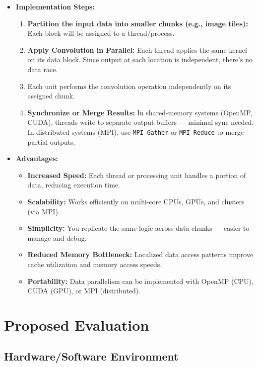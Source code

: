 \documentclass[conference, 10pt]{IEEEtran}
\begin{document}
\begin{itemize}
    \item \textbf{Implementation Steps:}
    \begin{enumerate}
        \item \textbf{Partition the input data into smaller chunks (e.g., image tiles):} Each block will be assigned to a thread/process.
        \item \textbf{Apply Convolution in Parallel:} Each thread applies the same kernel on its data block. Since output at each location is independent, there's no data race.
        \item Each unit performs the convolution operation independently on its assigned chunk.
        \item \textbf{Synchronize or Merge Results:} In shared-memory systems (OpenMP, CUDA), threads write to separate output buffers — minimal sync needed. In distributed systems (MPI), use \texttt{MPI\_Gather} or \texttt{MPI\_Reduce} to merge partial outputs.
    \end{enumerate}
    \item \textbf{Advantages:}
    \begin{itemize}
        \item \textbf{Increased Speed:} Each thread or processing unit handles a portion of data, reducing execution time.
        \item \textbf{Scalability:} Works efficiently on multi-core CPUs, GPUs, and clusters (via MPI).
        \item \textbf{Simplicity:} You replicate the same logic across data chunks — easier to manage and debug.
        \item \textbf{Reduced Memory Bottleneck:} Localized data access patterns improve cache utilization and memory access speeds.
        \item \textbf{Portability:} Data parallelism can be implemented with OpenMP (CPU), CUDA (GPU), or MPI (distributed).
    \end{itemize}
\end{itemize}





\section{Proposed Evaluation}

\subsection{\textbf{Hardware/Software Environment}}
\end{document}
